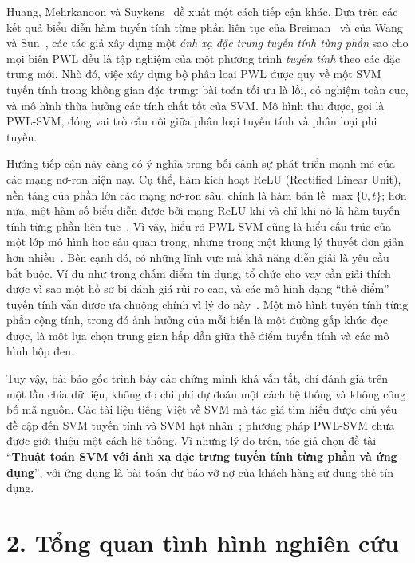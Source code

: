 Huang, Mehrkanoon và Suykens~\cite{huang2013} đề xuất một cách tiếp cận khác. Dựa trên các kết quả biểu diễn hàm tuyến tính từng phần liên tục của Breiman~\cite{breiman1993} và của Wang và Sun~\cite{wang2005}, các tác giả xây dựng một \emph{ánh xạ đặc trưng tuyến tính từng phần} sao cho mọi biên PWL đều là tập nghiệm của một phương trình \emph{tuyến tính} theo các đặc trưng mới. Nhờ đó, việc xây dựng bộ phân loại PWL được quy về một SVM tuyến tính trong không gian đặc trưng: bài toán tối ưu là lồi, có nghiệm toàn cục, và mô hình thừa hưởng các tính chất tốt của SVM. Mô hình thu được, gọi là PWL-SVM, đóng vai trò cầu nối giữa phân loại tuyến tính và phân loại phi tuyến.

Hướng tiếp cận này càng có ý nghĩa trong bối cảnh sự phát triển mạnh mẽ của các mạng nơ-ron hiện nay. Cụ thể, hàm kích hoạt ReLU (Rectified Linear Unit), nền tảng của phần lớn các mạng nơ-ron sâu, chính là hàm bản lề $\max\{0,t\}$; hơn nữa, một hàm số biểu diễn được bởi mạng ReLU khi và chỉ khi nó là hàm tuyến tính từng phần liên tục~\cite{arora2018}. Vì vậy, hiểu rõ PWL-SVM cũng là hiểu cấu trúc của một lớp mô hình học sâu quan trọng, nhưng trong một khung lý thuyết đơn giản hơn nhiều~\cite{tao2022}. Bên cạnh đó, có những lĩnh vực mà khả năng diễn giải là yêu cầu bắt buộc. Ví dụ như trong chấm điểm tín dụng, tổ chức cho vay cần giải thích được vì sao một hồ sơ bị đánh giá rủi ro cao, và các mô hình dạng “thẻ điểm” tuyến tính vẫn được ưa chuộng chính vì lý do này~\cite{thomas2002}. Một mô hình tuyến tính từng phần cộng tính, trong đó ảnh hưởng của mỗi biến là một đường gấp khúc đọc được, là một lựa chọn trung gian hấp dẫn giữa thẻ điểm tuyến tính và các mô hình hộp đen.

Tuy vậy, bài báo gốc trình bày các chứng minh khá vắn tắt, chỉ đánh giá trên một lần chia dữ liệu, không đo chi phí dự đoán một cách hệ thống và không công bố mã nguồn. Các tài liệu tiếng Việt về SVM mà tác giả tìm hiểu được chủ yếu đề cập đến SVM tuyến tính và SVM hạt nhân~\cite{vuhuutiep2018}; phương pháp PWL-SVM chưa được giới thiệu một cách hệ thống. Vì những lý do trên, tác giả chọn đề tài “\textbf{Thuật toán SVM với ánh xạ đặc trưng tuyến tính từng phần và ứng dụng}”, với ứng dụng là bài toán dự báo vỡ nợ của khách hàng sử dụng thẻ tín dụng.

\section*{2. Tổng quan tình hình nghiên cứu}

